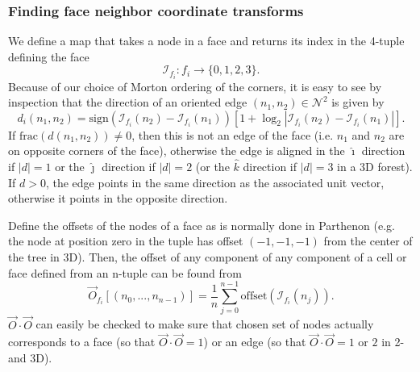 \documentclass{article}
\begin{document}
\subsubsection{Finding face neighbor coordinate transforms}
We define a map that takes a node in a face and returns its index in the 4-tuple defining the face
\begin{equation}
\mathcal{I}_{f_i}: f_i \rightarrow \{0, 1, 2, 3\}.  
\end{equation}
Because of our choice of Morton ordering of the corners, it is easy to see by inspection that the direction of an oriented edge $(n_1, n_2) \in \mathcal{N}^2$ is given by 
\begin{equation}
d_i(n_1, n_2) = \textrm{sign}(\mathcal{I}_{f_i}(n_2) -  \mathcal{I}_{f_i}(n_1)) \left[1 + \log_2 \left |\mathcal{I}_{f_i}(n_2) -  \mathcal{I}_{f_i}(n_1)\right|\right].
\end{equation}
If $\textrm{frac}(d(n_1, n_2)) \neq 0$, then this is not an edge of the face (i.e. $n_1$ and $n_2$ are on opposite corners of the face), otherwise the edge is aligned in the $\hat \imath$ direction if $|d| = 1$ or the $\hat \jmath$ direction if $|d| = 2$ (or the $\hat k$ direction if $|d|=3$ in a 3D forest). If $ d > 0$, the edge points in the same direction as the associated unit vector, otherwise it points in the opposite direction. 

Define the offsets of the nodes of a face as is normally done in Parthenon (e.g. the node at position zero in the tuple has offset $(-1, -1, -1)$ from the center of the tree in 3D). Then, the offset of any component of any component of a cell or face defined from an n-tuple can be found from 
\begin{equation}
\vec{O}_{f_i}[(n_0, ..., n_{n-1})] = \frac{1}{n} \sum_{j=0}^{n-1} \textrm{offset}(\mathcal{I}_{f_i}(n_j)).
\end{equation}
$\vec{O} \cdot \vec{O}$ can easily be checked to make sure that chosen set of nodes actually corresponds to a face (so that $\vec{O} \cdot \vec{O} = 1$) or an edge (so that $\vec{O} \cdot \vec{O} = 1 \textrm{ or } 2$ in 2- and 3D).
\end{document}
